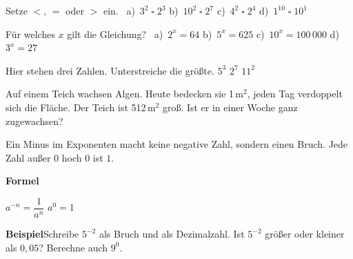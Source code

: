 \documentclass[11pt]{article}
\makeatletter
\newcommand{\aufg}[3]{\par\noindent\makebox[0pt][r]{#3}\begin{minipage}[t]{\linewidth}#1\end{minipage}\par}
\newcommand{\nr}[1]{\makebox[7mm][l]{\textbf{#1}}}
\newlength{\kr}
\newcommand{\karomerk}[2]{\protected@write\@auxout{}{\string\karoseite{#1}{#2}{\thepage}}}
\newcommand{\karoseite}[3]{\expandafter\xdef\csname karo@#1@#2\endcsname{#3}}
\makeatother
\begin{document}
\aufg{\nr{1.}Setze $<$, $=$ oder $>$ ein. \ a)~$3^2 \;\square\; 2^3$ \qquad b)~$10^2 \;\square\; 2^7$ \qquad c)~$4^2 \;\square\; 2^4$ \qquad d)~$1^{10} \;\square\; 10^1$}{}{}
\medskip
\aufg{\nr{2.}Für welches $x$ gilt die Gleichung? \ a)~$2^x = 64$ \qquad b)~$5^x = 625$ \qquad c)~$10^x = 100\,000$ \qquad d)~$3^x = 27$}{}{}
\medskip
\aufg{\nr{3.}Hier stehen drei Zahlen. Unterstreiche die größte. \quad $5^3$ \qquad $2^7$ \qquad $11^2$}{}{}
\medskip
\aufg{\nr{4.}Auf einem Teich wachsen Algen. Heute bedecken sie 1\,m$^2$, jeden Tag verdoppelt sich die Fläche. Der Teich ist 512\,m$^2$ groß. Ist er in einer Woche ganz zugewachsen?}{}{{\scriptsize\color{mbgrau}Ziel\hspace{2mm}}}
\medskip
\par\vspace{3mm}\setlength{\kr}{\dimexpr\pagegoal-\pagetotal-10mm\relax}%
\ifdim\kr>12mm\karomerk{k}{C}\noindent{\scriptsize\color{mbgrau}Platz zum Rechnen}\par\nointerlineskip\vspace{1mm}\noindent
\begin{tikzpicture}\clip (0,0) rectangle ({\linewidth-0.5mm},\kr);\draw[black!16,line width=0.3pt,step=5mm] (0,0) grid (\linewidth,\kr);\end{tikzpicture}\fi\par
\clearpage\label{s:D}\noindent\colorbox{black!12}{}\hspace{3mm}{\Large\bfseries Negative Hochzahl und hoch null}\par\smallskip
\noindent Ein Minus im Exponenten macht keine negative Zahl, sondern einen Bruch. Jede Zahl außer $0$ hoch $0$ ist $1$.\par\medskip
\noindent\textbf{Formel}\par\nopagebreak\noindent\hspace*{4mm}\begin{minipage}{\dimexpr\linewidth-4mm\relax}$a^{-n} = \dfrac{1}{a^n}$ \qquad $a^0 = 1$\end{minipage}\par\medskip
\noindent\textbf{Beispiel}\quad Schreibe $5^{-2}$ als Bruch und als Dezimalzahl. Ist $5^{-2}$ größer oder kleiner als $0{,}05$? Berechne auch $9^0$.\par\smallskip
\end{document}

